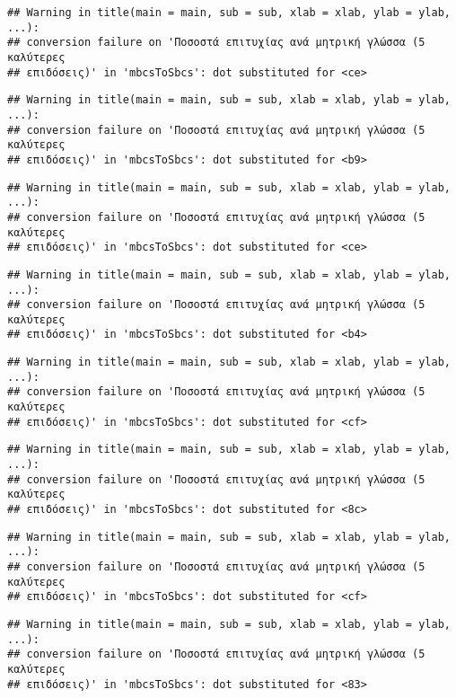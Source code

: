 \documentclass[
]{article}
\begin{document}
\begin{verbatim}
## Warning in title(main = main, sub = sub, xlab = xlab, ylab = ylab, ...):
## conversion failure on 'Ποσοστά επιτυχίας ανά μητρική γλώσσα (5 καλύτερες
## επιδόσεις)' in 'mbcsToSbcs': dot substituted for <ce>
\end{verbatim}

\begin{verbatim}
## Warning in title(main = main, sub = sub, xlab = xlab, ylab = ylab, ...):
## conversion failure on 'Ποσοστά επιτυχίας ανά μητρική γλώσσα (5 καλύτερες
## επιδόσεις)' in 'mbcsToSbcs': dot substituted for <b9>
\end{verbatim}

\begin{verbatim}
## Warning in title(main = main, sub = sub, xlab = xlab, ylab = ylab, ...):
## conversion failure on 'Ποσοστά επιτυχίας ανά μητρική γλώσσα (5 καλύτερες
## επιδόσεις)' in 'mbcsToSbcs': dot substituted for <ce>
\end{verbatim}

\begin{verbatim}
## Warning in title(main = main, sub = sub, xlab = xlab, ylab = ylab, ...):
## conversion failure on 'Ποσοστά επιτυχίας ανά μητρική γλώσσα (5 καλύτερες
## επιδόσεις)' in 'mbcsToSbcs': dot substituted for <b4>
\end{verbatim}

\begin{verbatim}
## Warning in title(main = main, sub = sub, xlab = xlab, ylab = ylab, ...):
## conversion failure on 'Ποσοστά επιτυχίας ανά μητρική γλώσσα (5 καλύτερες
## επιδόσεις)' in 'mbcsToSbcs': dot substituted for <cf>
\end{verbatim}

\begin{verbatim}
## Warning in title(main = main, sub = sub, xlab = xlab, ylab = ylab, ...):
## conversion failure on 'Ποσοστά επιτυχίας ανά μητρική γλώσσα (5 καλύτερες
## επιδόσεις)' in 'mbcsToSbcs': dot substituted for <8c>
\end{verbatim}

\begin{verbatim}
## Warning in title(main = main, sub = sub, xlab = xlab, ylab = ylab, ...):
## conversion failure on 'Ποσοστά επιτυχίας ανά μητρική γλώσσα (5 καλύτερες
## επιδόσεις)' in 'mbcsToSbcs': dot substituted for <cf>
\end{verbatim}

\begin{verbatim}
## Warning in title(main = main, sub = sub, xlab = xlab, ylab = ylab, ...):
## conversion failure on 'Ποσοστά επιτυχίας ανά μητρική γλώσσα (5 καλύτερες
## επιδόσεις)' in 'mbcsToSbcs': dot substituted for <83>
\end{verbatim}
\end{document}
